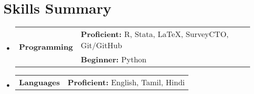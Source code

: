\documentclass[a4paper]{scrartcl}
\begin{document}
\section{Skills Summary}
\vspace{-2pt}
\begin{itemize}[leftmargin=0pt, label = {}]
    \item
        \begin{tabularx}{\textwidth}{p{3cm}X}
            \multirow{2}{=}{\textbf{Programming}} 
            & \textbf{Proficient:} R, Stata, LaTeX, SurveyCTO, Git/GitHub \\
            & \textbf{Beginner: } Python \\
        \end{tabularx}
    \item 
        \vspace{-5pt}
        \begin{tabularx}{\textwidth}{p{3cm}X}
            \textbf{Languages}& \textbf{Proficient:} English, Tamil, Hindi\\
        \end{tabularx}
\end{itemize}
\end{document}
